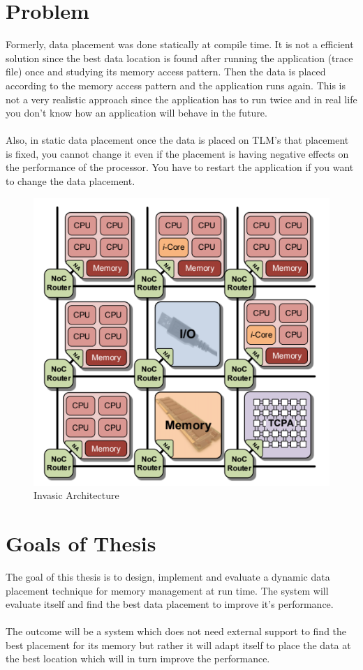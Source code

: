 \documentclass{listhesis}
\begin{document}
\section{Problem}
Formerly, data placement was done statically at compile time. It is not a efficient solution since the best data location is found after running the application (trace file) once and studying its memory access pattern. Then the data is placed according to the memory access pattern and the application runs again. This is not a very realistic approach since the application has to run twice and in real life you don't know how an application will behave in the future.\\
\\
Also, in static data placement once the data is placed on TLM's that placement is fixed, you cannot change it even if the placement is having negative effects on the performance of the processor. You have to restart the application if you want to change the data placement. 
\begin{figure}[h!]
  \includegraphics[width=0.5\linewidth]{multi-core,tile.png}
  \centering
  \caption{Invasic Architecture~\cite{iNetworkAdapter}}
  \label{fig:multi-core,tile}
\end{figure}
\section{Goals of Thesis}
The goal of this thesis is to design, implement and evaluate a dynamic data placement technique for memory management at run time. The system will evaluate itself and find the best data placement to improve it's performance. \\
\\
The outcome will be a system which does not need external support to find the best placement for its memory but rather it will adapt itself to place the data at the best location which will in turn improve the performance. 
\end{document}
